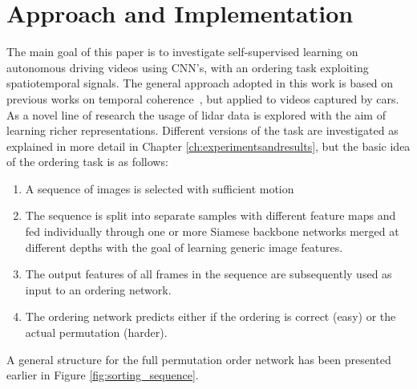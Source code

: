 %
\newpage
\chapter{Approach and Implementation}
\label{ch:approach_implementation}
The main goal of this paper is to investigate self-supervised learning on autonomous driving videos using CNN's, with an ordering task exploiting spatiotemporal signals. The general approach adopted in this work is based on previous works on temporal coherence~\cite{misra2016,lee2017}, but applied to videos captured by cars. As a novel line of research the usage of lidar data is explored with the aim of learning richer representations. Different versions of the task are investigated as explained in more detail in Chapter \ref{ch:experimentsandresults}, but the basic idea of the ordering task is as follows:
\begin{enumerate}    
\item A sequence of images is selected with sufficient motion
\item The sequence is split into separate samples with different feature maps and fed individually through one or more Siamese backbone networks merged at different depths with the goal of learning generic image features.
\item The output features of all frames in the sequence are subsequently used as input to an ordering network.
\item The ordering network predicts either if the ordering is correct (easy)\cite{misra2016} or the actual permutation (harder)\cite{lee2017}.
\end{enumerate}
A general structure for the full permutation order network has been presented earlier in Figure \ref{fig:sorting_sequence}.

